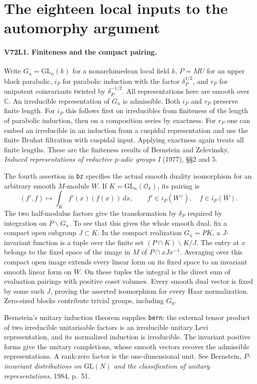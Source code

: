 \section{The eighteen local inputs to the automorphy argument}

\paragraph{V72L1. Finiteness and the compact pairing.}
Write $G_n=\mathrm{GL}_n(k)$ for a nonarchimedean local field $k$,
$P=MU$ for an upper block parabolic, $i_P$ for parabolic induction
with the factor $\delta_P^{1/2}$, and $r_P$ for unipotent
coinvariants twisted by $\delta_P^{-1/2}$. All representations here
are smooth over $\mathbb C$. An irreducible representation of $G_n$
is admissible. Both $i_P$ and $r_P$ preserve finite length.
For $i_P$ this follows first on irreducibles from finiteness of
the length of parabolic induction, then on a composition series by
exactness. For $r_P$ one can embed an irreducible in an induction
from a cuspidal representation and use the finite Bruhat filtration
with cuspidal input. Applying exactness again treats all finite
lengths. These are the finiteness results of Bernstein and Zelevinsky,
\emph{Induced representations of reductive $p$-adic groups I}
(1977), \S\S2 and 5.

The fourth assertion in \texttt{bz} specifies the actual smooth
duality isomorphism for an arbitrary smooth $M$-module $W$. If
$K=\mathrm{GL}_n(\mathcal O_k)$, its pairing is
\[
 (f',f)\longmapsto\int_K f'(x)(f(x))\,dx,
 \qquad f'\in i_P(W^\vee),\quad f\in i_P(W).
\]
The two half-modulus factors give the transformation by $\delta_P$
required by integration on $P\backslash G_n$. To see that this gives
the whole smooth dual, fix a compact open subgroup $J\subset K$.
In the compact realization $G_n=PK$, a $J$-invariant function is a
tuple over the finite set $(P\cap K)\backslash K/J$. The entry at $x$
belongs to the fixed space of the image in $M$ of
$P\cap xJx^{-1}$. Averaging over this compact open image extends
every linear form on its fixed space to an invariant smooth linear
form on $W$. On these tuples the integral is the direct sum of
evaluation pairings with positive coset volumes. Every smooth dual
vector is fixed by some such $J$, proving the asserted isomorphism
for every Haar normalization. Zero-sized blocks contribute trivial
groups, including $G_0$.

Bernstein's unitary induction theorem supplies \texttt{bern}: the
external tensor product of two irreducible unitarisable factors is
an irreducible unitary Levi representation, and its normalized
induction is irreducible. The invariant positive forms give the
unitary completions, whose smooth vectors recover the admissible
representations. A rank-zero factor is the one-dimensional unit.
See Bernstein, \emph{$P$-invariant distributions on $\mathrm{GL}(N)$
and the classification of unitary representations}, 1984, p.~51.

